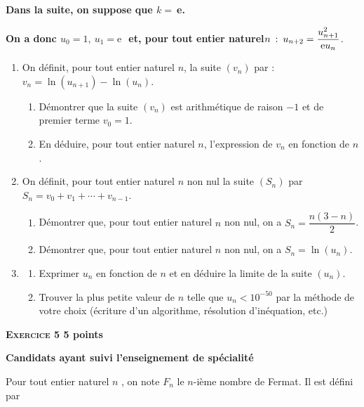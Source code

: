 \documentclass[10pt,a4paper]{article}
\begin{document}
\textbf{Dans la suite, on suppose que \boldmath $k = \:$\unboldmath e.}

\textbf{On a donc \boldmath $u_0 = 1,\: u_1 = \text{e }$ \unboldmath\: et, pour tout entier naturel}\boldmath $n \::\: u_{n+2} = \dfrac{u^2_{n+1}}{{\rm e}u_n}$\unboldmath.

\begin{enumerate}[resume]
\item  On définit, pour tout entier naturel $n$, la suite $\left(v_n\right)$ par : $v_n = \ln \left(u_{n+1}\right) - \ln \left(u_n\right)$.
	\begin{enumerate}
		\item Démontrer que la suite $\left(v_n\right)$ est arithmétique de raison $- 1$ et de premier terme $v_0 = 1$.
		\item En déduire, pour tout entier naturel $n$, l'expression de $v_n$ en fonction de $n$.
	\end{enumerate}
\item  On définit, pour tout entier naturel $n$ non nul la suite $\left(S_n\right)$ par $S_n = v_0 + v_1 + \cdots + v_{n-1}$.
	\begin{enumerate}
		\item Démontrer que, pour tout entier naturel $n$ non nul, on a $S_n = \dfrac{n(3 - n)}{2}$.
		\item Démontrer que, pour tout entier naturel $n$ non nul, on a $S_n = \ln \left(u_n\right)$.
	\end{enumerate}
\item 
	\begin{enumerate}
		\item Exprimer $u_n$ en fonction de $n$ et en déduire la limite de la suite $\left(u_n\right)$.
		\item Trouver la plus petite valeur de $n$ telle que $u_n < 10^{-50}$ par la méthode de votre choix (écriture d'un algorithme, résolution d'inéquation, etc.)
	\end{enumerate}
\end{enumerate}

\vspace{0,5cm}
\setlength\parindent{0mm}

\textbf{\textsc{Exercice 5} \hfill 5 points}

\textbf{Candidats ayant suivi l'enseignement de spécialité}

\medskip

Pour tout entier naturel $n$ , on note $F_n$ le $n$-ième nombre de Fermat. Il est défini par
\end{document}
